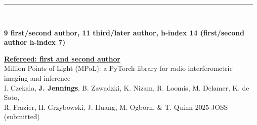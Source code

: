 \documentclass[10pt,preprint]{aastex}
\newcommand*{\xdash}[1][3em]{\rule[0.5ex]{#1}{0.7pt}}
\begin{document}


 \xdash[89.5ex] \\
\centerline{{\bf 9 first/second author, 11 third/later author, h-index 14 (first/second author h-index 7)}}

\noindent \underline{{\bf Refereed: first and second author}} \\
\noindent Million Points of Light (MPoL): a PyTorch library for radio interferometric imaging and inference \\
\indent I. Czekala, {\bf J. Jennings}, B. Zawadzki, K. Nizam, R. Loomis, M. Delamer, K. de Soto, \\ 
\indent R. Frazier, H. Grzybowski, J. Huang, M. Ogborn, \& T. Quinn 2025 JOSS (submitted)
\end{document}
